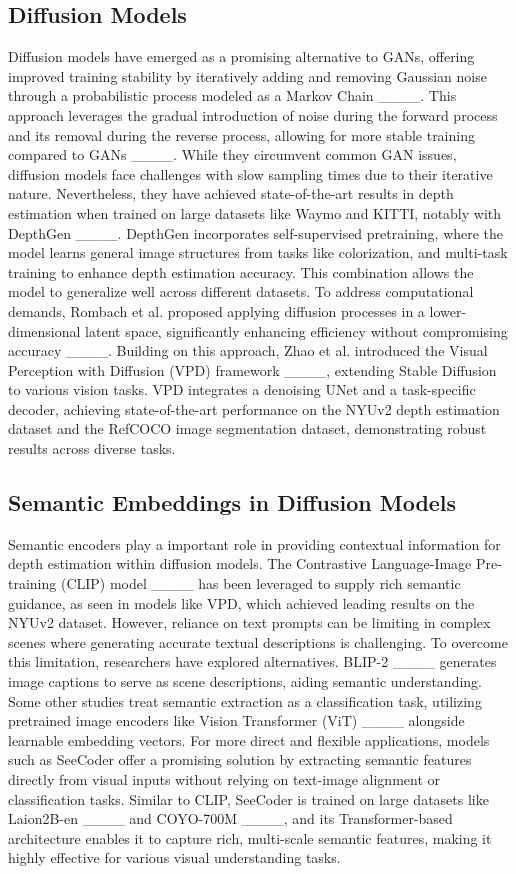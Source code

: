 \subsection{Diffusion Models}
Diffusion models have emerged as a promising alternative to GANs, offering improved training stability by iteratively adding and removing Gaussian noise through a probabilistic process modeled as a Markov Chain ____. This approach leverages the gradual introduction of noise during the forward process and its removal during the reverse process, allowing for more stable training compared to GANs ____. While they circumvent common GAN issues, diffusion models face challenges with slow sampling times due to their iterative nature. Nevertheless, they have achieved state-of-the-art results in depth estimation when trained on large datasets like Waymo and KITTI, notably with DepthGen ____. DepthGen incorporates self-supervised pretraining, where the model learns general image structures from tasks like colorization, and multi-task training to enhance depth estimation accuracy. This combination allows the model to generalize well across different datasets. To address computational demands, Rombach et al. proposed applying diffusion processes in a lower-dimensional latent space, significantly enhancing efficiency without compromising accuracy ____. Building on this approach, Zhao et al. introduced the Visual Perception with Diffusion (VPD) framework ____, extending Stable Diffusion to various vision tasks. VPD integrates a denoising UNet and a task-specific decoder, achieving state-of-the-art performance on the NYUv2 depth estimation dataset and the RefCOCO image segmentation dataset, demonstrating robust results across diverse tasks.


\subsection{Semantic Embeddings in Diffusion Models}
Semantic encoders play a important role in providing contextual information for depth estimation within diffusion models. The Contrastive Language-Image Pre-training (CLIP) model ____ has been leveraged to supply rich semantic guidance, as seen in models like VPD, which achieved leading results on the NYUv2 dataset. However, reliance on text prompts can be limiting in complex scenes where generating accurate textual descriptions is challenging. To overcome this limitation, researchers have explored alternatives. BLIP-2 ____ generates image captions to serve as scene descriptions, aiding semantic understanding. Some other studies treat semantic extraction as a classification task, utilizing pretrained image encoders like Vision Transformer (ViT) ____ alongside learnable embedding vectors. For more direct and flexible applications, models such as SeeCoder offer a promising solution by extracting semantic features directly from visual inputs without relying on text-image alignment or classification tasks. Similar to CLIP, SeeCoder is trained on large datasets like Laion2B-en ____ and COYO-700M ____, and its Transformer-based architecture enables it to capture rich, multi-scale semantic features, making it highly effective for various visual understanding tasks.


